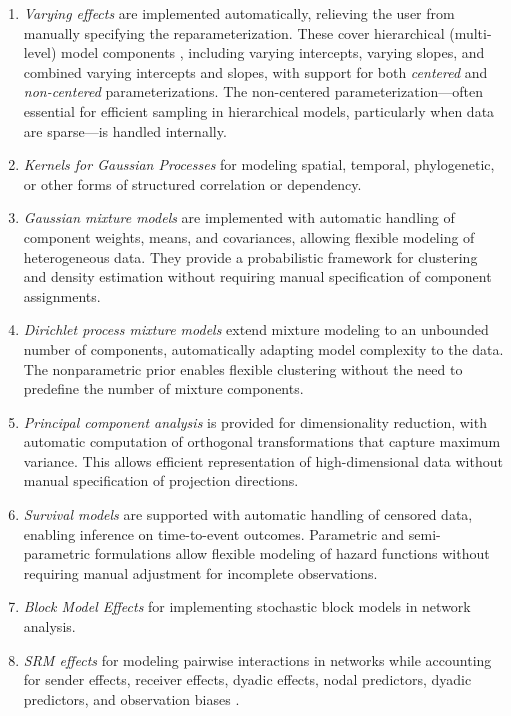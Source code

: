 \documentclass[blind,lineno,num-refs]{wiley-article}
\begin{document}
\begin{enumerate}
  \item \textit{Varying effects} are implemented automatically, relieving the user from manually specifying the reparameterization. These cover hierarchical (multi-level) model components \citep{rethinking}, including varying intercepts, varying slopes, and combined varying intercepts and slopes, with support for both \textit{centered} and \textit{non-centered} parameterizations. The non-centered parameterization—often essential for efficient sampling in hierarchical models, particularly when data are sparse—is handled internally.
  
  \item \textit{Kernels for Gaussian Processes} for modeling spatial, temporal, phylogenetic, or other forms of structured correlation or dependency.

  \item \textit{Gaussian mixture models} are implemented with automatic handling of component weights, means, and covariances, allowing flexible modeling of heterogeneous data. They provide a probabilistic framework for clustering and density estimation without requiring manual specification of component assignments.

  \item \textit{Dirichlet process mixture models} extend mixture modeling to an unbounded number of components, automatically adapting model complexity to the data. The nonparametric prior enables flexible clustering without the need to predefine the number of mixture components.

  \item \textit{Principal component analysis} is provided for dimensionality reduction, with automatic computation of orthogonal transformations that capture maximum variance. This allows efficient representation of high-dimensional data without manual specification of projection directions.

  \item \textit{Survival models} are supported with automatic handling of censored data, enabling inference on time-to-event outcomes. Parametric and semi-parametric formulations allow flexible modeling of hazard functions without requiring manual adjustment for incomplete observations.
  
  \item \textit{Block Model Effects} for implementing stochastic block models in network analysis.
  
  \item \textit{SRM effects} for modeling pairwise interactions in networks while accounting for sender effects, receiver effects, dyadic effects, nodal predictors, dyadic predictors, and observation biases \citep{STRAND2025}.
  

\end{enumerate}
\end{document}
